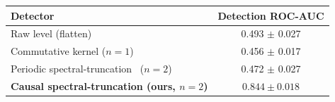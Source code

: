 \begin{tabular}{lc}
  \toprule
  Detector & Detection ROC-AUC \\
  \midrule
  Raw level (flatten) & 0.493 $\pm$ 0.027 \\
  Commutative kernel ($n=1$) & 0.456 $\pm$ 0.017 \\
  Periodic spectral-truncation~\citep{hashimoto2024spectral} ($n=2$) & 0.472 $\pm$ 0.027 \\
  \textbf{Causal spectral-truncation (ours, $n=2$)} & $\mathbf{0.844 \pm 0.018}$ \\
  \bottomrule
\end{tabular}
